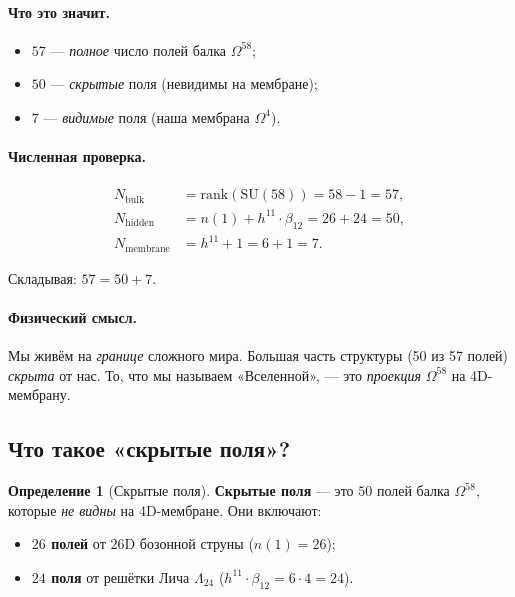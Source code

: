\documentclass[11pt,a4paper]{article}
\newcommand{\SU}{\mathrm{SU}}
\newcommand{\Om}{\Omega^4}
\newcommand{\Omfi}{\Omega^{58}}
\newcommand{\Nbulk}{N_{\text{bulk}}}
\newcommand{\Nhidden}{N_{\text{hidden}}}
\newcommand{\Nmembrane}{N_{\text{membrane}}}
\theoremstyle{definition}
\newtheorem{definition}[theorem]{Определение}
\begin{document}
\paragraph{Что это значит.}
\begin{itemize}
    \item $57$ — \emph{полное} число полей балка $\Omfi$;
    \item $50$ — \emph{скрытые} поля (невидимы на мембране);
    \item $7$ — \emph{видимые} поля (наша мембрана $\Om$).
\end{itemize}

\paragraph{Численная проверка.}
\begin{align}
    \Nbulk &= \mathrm{rank}(\SU(58)) = 58 - 1 = 57, \\
    \Nhidden &= n(1) + h^{11} \cdot \beta_{12} = 26 + 24 = 50, \\
    \Nmembrane &= h^{11} + 1 = 6 + 1 = 7.
\end{align}

Складывая: $57 = 50 + 7$. \checkmark

\paragraph{Физический смысл.}
Мы живём на \emph{границе} сложного мира. Большая часть 
структуры (50 из 57 полей) \emph{скрыта} от нас. То, что мы 
называем «Вселенной», — это \emph{проекция} $\Omfi$ на 
4D-мембрану.

\subsection{Что такое «скрытые поля»?}
\label{subsec:hidden-fields}

\begin{definition}[Скрытые поля]
\label{def:hidden-fields}
\textbf{Скрытые поля} — это $50$ полей балка $\Omfi$, которые 
\emph{не видны} на 4D-мембране. Они включают:
\begin{itemize}
    \item \textbf{$26$ полей} от $26$D бозонной струны 
          ($n(1) = 26$);
    \item \textbf{$24$ поля} от решётки Лича $\Lambda_{24}$ 
          ($h^{11} \cdot \beta_{12} = 6 \cdot 4 = 24$).
\end{itemize}
\end{definition}
\end{document}
